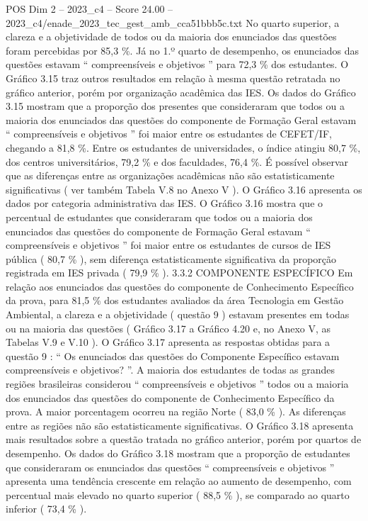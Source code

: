 \begin{textsample}{POS Dim 2 – 2023\_c4 – Score 24.00 – 2023\_c4/enade\_2023\_tec\_gest\_amb\_cca51bbb5c.txt}
No quarto superior, a clareza e a objetividade de todos ou da maioria dos enunciados das questões foram percebidas por 85,3 \%.
Já no 1.º quarto de desempenho, os enunciados das questões estavam “ compreensíveis e objetivos ” para 72,3 \% dos estudantes.
O Gráfico 3.15 traz outros resultados em relação à mesma questão retratada no gráfico anterior, porém por organização acadêmica das IES.
Os dados do Gráfico 3.15 mostram que a proporção dos presentes que consideraram que todos ou a maioria dos enunciados das questões do componente de Formação Geral estavam “ compreensíveis e objetivos ” foi maior entre os estudantes de CEFET/IF, chegando a 81,8 \%.
Entre os estudantes de universidades, o índice atingiu 80,7 \%, dos centros universitários, 79,2 \% e dos faculdades, 76,4 \%.
É possível observar que as diferenças entre as organizações acadêmicas não são estatisticamente significativas ( ver também Tabela V.8 no Anexo V ).
O Gráfico 3.16 apresenta os dados por categoria administrativa das IES.
O Gráfico 3.16 mostra que o percentual de estudantes que consideraram que todos ou a maioria dos enunciados das questões do componente de Formação Geral estavam “ compreensíveis e objetivos ” foi maior entre os estudantes de cursos de IES pública ( 80,7 \% ), sem diferença estatisticamente significativa da proporção registrada em IES privada ( 79,9 \% ). 3.3.2 COMPONENTE ESPECÍFICO Em relação aos enunciados das questões do componente de Conhecimento Específico da prova, para 81,5 \% dos estudantes avaliados da área Tecnologia em Gestão Ambiental, a clareza e a objetividade ( questão 9 ) estavam presentes em todas ou na maioria das questões ( Gráfico 3.17 a Gráfico 4.20 e, no Anexo V, as Tabelas V.9 e V.10 ).
O Gráfico 3.17 apresenta as respostas obtidas para a questão 9 : “ Os enunciados das questões do Componente Específico estavam compreensíveis e objetivos? ”.
A maioria dos estudantes de todas as grandes regiões brasileiras considerou “ compreensíveis e objetivos ” todos ou a maioria dos enunciados das questões do componente de Conhecimento Específico da prova.
A maior porcentagem ocorreu na região Norte ( 83,0 \% ).
As diferenças entre as regiões não são estatisticamente significativas.
O Gráfico 3.18 apresenta mais resultados sobre a questão tratada no gráfico anterior, porém por quartos de desempenho.
Os dados do Gráfico 3.18 mostram que a proporção de estudantes que consideraram os enunciados das questões “ compreensíveis e objetivos ” apresenta uma tendência crescente em relação ao aumento de desempenho, com percentual mais elevado no quarto superior ( 88,5 \% ), se comparado ao quarto inferior ( 73,4 \% ).

\end{textsample}
